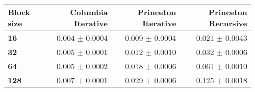 \begin{tabular}{lrrr}\toprule
\textbf{Block size}  & \textbf{Columbia Iterative} & \textbf{Princeton Iterative} & \textbf{Princeton Recursive}\\\midrule
\textbf{16}  & 0.004 $\pm$ 0.0004 & 0.009 $\pm$ 0.0004 & 0.021 $\pm$ 0.0043\\
\textbf{32}  & 0.005 $\pm$ 0.0001 & 0.012 $\pm$ 0.0010 & 0.032 $\pm$ 0.0006\\
\textbf{64}  & 0.005 $\pm$ 0.0002 & 0.018 $\pm$ 0.0006 & 0.061 $\pm$ 0.0010\\
\textbf{128} & 0.007 $\pm$ 0.0001 & 0.029 $\pm$ 0.0006 & 0.125 $\pm$ 0.0018\\
\bottomrule
\end{tabular}
